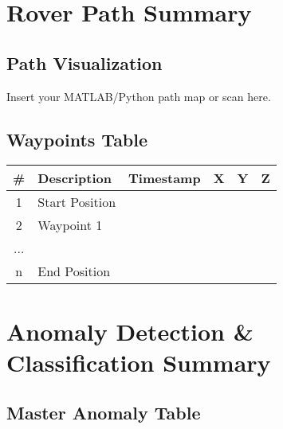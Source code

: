 \documentclass[12pt,a4paper]{report}
\begin{document}

\chapter{Rover Path Summary}
\section{Path Visualization}
\vspace{0.7em}
Insert your MATLAB/Python path map or scan here.\\[1em]
\noindent
\begin{center}
\end{center}

\section{Waypoints Table}

\begin{center}
\begin{tabularx}{\textwidth}{|c|X|X|X|X|X|}
\hline
\textbf{\#} & \textbf{Description} & \textbf{Timestamp} & \textbf{X} & \textbf{Y} & \textbf{Z} \\
\hline
1 & Start Position & & & & \\
2 & Waypoint 1 & & & & \\
... &  &  &  &  &  \\
n & End Position & & & & \\
\hline
\end{tabularx}
\end{center}


\chapter{Anomaly Detection \& Classification Summary}
\section{Master Anomaly Table}
\end{document}
